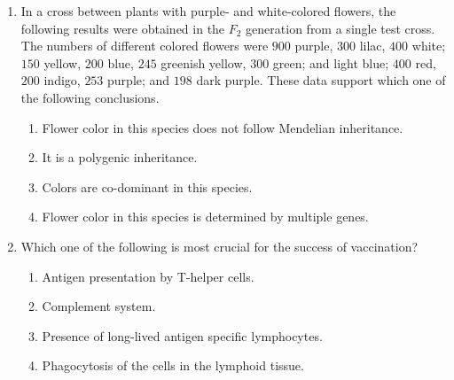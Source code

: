 \documentclass[journal,12pt,onecolumn]{IEEEtran}
\theoremstyle{remark}
\begin{document}
\begin{enumerate}
    \item In a cross between plants with purple- and white-colored flowers, the following results were obtained in the $F_2$ generation from a single test cross. The numbers of different colored flowers were $900$ purple, $300$ lilac, $400$ white; $150$ yellow, $200$ blue, $245$ greenish yellow, $300$ green; and light blue; $400$ red, $200$ indigo, $253$ purple; and $198$ dark purple. These data support which one of the following conclusions.

    \hfill{}
    \begin{enumerate}
        \item Flower color in this species does not follow Mendelian inheritance.
        \item It is a polygenic inheritance.
        \item Colors are co-dominant in this species.
        \item Flower color in this species is determined by multiple genes.
    \end{enumerate}

    \item Which one of the following is most crucial for the success of vaccination?

    \hfill{}
    \begin{enumerate}
        \item Antigen presentation by T-helper cells.
        \item Complement system.
        \item Presence of long-lived antigen specific lymphocytes.
        \item Phagocytosis of the cells in the lymphoid tissue.
    \end{enumerate}


\end{enumerate}
\end{document}
